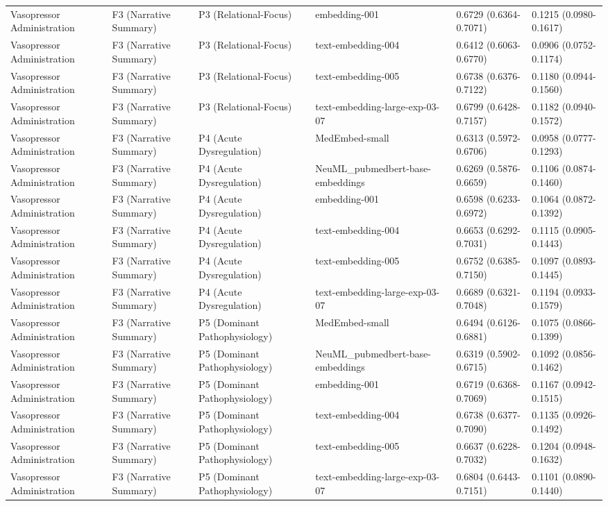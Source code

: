 \documentclass[border=0pt]{standalone}
\begin{document}
\begin{adjustbox}{width=\textwidth}
\begin{tabular}{llllll}
Vasopressor Administration & F3 (Narrative Summary) & P3 (Relational-Focus) & embedding-001 & 0.6729 (0.6364-0.7071) & 0.1215 (0.0980-0.1617) \\
Vasopressor Administration & F3 (Narrative Summary) & P3 (Relational-Focus) & text-embedding-004 & 0.6412 (0.6063-0.6770) & 0.0906 (0.0752-0.1174) \\
Vasopressor Administration & F3 (Narrative Summary) & P3 (Relational-Focus) & text-embedding-005 & 0.6738 (0.6376-0.7122) & 0.1180 (0.0944-0.1560) \\
Vasopressor Administration & F3 (Narrative Summary) & P3 (Relational-Focus) & text-embedding-large-exp-03-07 & 0.6799 (0.6428-0.7157) & 0.1182 (0.0940-0.1572) \\
Vasopressor Administration & F3 (Narrative Summary) & P4 (Acute Dysregulation) & MedEmbed-small & 0.6313 (0.5972-0.6706) & 0.0958 (0.0777-0.1293) \\
Vasopressor Administration & F3 (Narrative Summary) & P4 (Acute Dysregulation) & NeuML\_pubmedbert-base-embeddings & 0.6269 (0.5876-0.6659) & 0.1106 (0.0874-0.1460) \\
Vasopressor Administration & F3 (Narrative Summary) & P4 (Acute Dysregulation) & embedding-001 & 0.6598 (0.6233-0.6972) & 0.1064 (0.0872-0.1392) \\
Vasopressor Administration & F3 (Narrative Summary) & P4 (Acute Dysregulation) & text-embedding-004 & 0.6653 (0.6292-0.7031) & 0.1115 (0.0905-0.1443) \\
Vasopressor Administration & F3 (Narrative Summary) & P4 (Acute Dysregulation) & text-embedding-005 & 0.6752 (0.6385-0.7150) & 0.1097 (0.0893-0.1445) \\
Vasopressor Administration & F3 (Narrative Summary) & P4 (Acute Dysregulation) & text-embedding-large-exp-03-07 & 0.6689 (0.6321-0.7048) & 0.1194 (0.0933-0.1579) \\
Vasopressor Administration & F3 (Narrative Summary) & P5 (Dominant Pathophysiology) & MedEmbed-small & 0.6494 (0.6126-0.6881) & 0.1075 (0.0866-0.1399) \\
Vasopressor Administration & F3 (Narrative Summary) & P5 (Dominant Pathophysiology) & NeuML\_pubmedbert-base-embeddings & 0.6319 (0.5902-0.6715) & 0.1092 (0.0856-0.1462) \\
Vasopressor Administration & F3 (Narrative Summary) & P5 (Dominant Pathophysiology) & embedding-001 & 0.6719 (0.6368-0.7069) & 0.1167 (0.0942-0.1515) \\
Vasopressor Administration & F3 (Narrative Summary) & P5 (Dominant Pathophysiology) & text-embedding-004 & 0.6738 (0.6377-0.7090) & 0.1135 (0.0926-0.1492) \\
Vasopressor Administration & F3 (Narrative Summary) & P5 (Dominant Pathophysiology) & text-embedding-005 & 0.6637 (0.6228-0.7032) & 0.1204 (0.0948-0.1632) \\
Vasopressor Administration & F3 (Narrative Summary) & P5 (Dominant Pathophysiology) & text-embedding-large-exp-03-07 & 0.6804 (0.6443-0.7151) & 0.1101 (0.0890-0.1440) \\
\bottomrule
\end{tabular}

\end{adjustbox}
\end{document}
